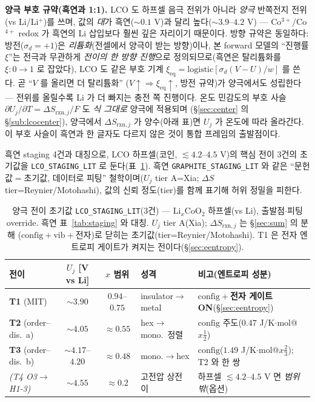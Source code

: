 \documentclass[11pt,a4paper]{article}
\newcommand{\eq}{\mathrm{eq}}
\newcommand{\rxn}{\mathrm{rxn}}
\newcommand{\config}{\mathrm{config}}
\newcommand{\vib}{\mathrm{vib}}
\newcommand{\code}[1]{\texttt{#1}}
\begin{document}
\textbf{양극 부호 규약(흑연과 1:1).} LCO 도 하프셀 음극 전위가 아니라 \emph{양극} 반쪽전지 전위(vs Li/Li$^+$)를 쓰며,
값의 \emph{대}가 흑연($\sim0.1$ V)과 달리 높다($\sim3.9$--$4.2$ V) — Co$^{3+}/$Co$^{4+}$ redox 가 흑연의 Li 삽입보다
훨씬 깊은 자리이기 때문이다. 방향 규약은 동일하다: 방전($\sigma_d=+1$)은 \emph{리튬화}(전셀에서 양극이 받는 방향)이나,
본 forward 모델의 ``진행률 $\xi$''는 전극과 무관하게 \emph{전이의 한 방향 진행}으로 정의되므로(흑연은 탈리튬화를 $\xi:0\to1$
로 잡았다), LCO 도 같은 부호 기계 $\xi_\eq=\mathrm{logistic}[\sigma_d(V-U)/w]$ 를 쓴다. 곧 ``$V$ 를 올리면 더 탈리튬화''
($V\!\uparrow\Rightarrow\xi_\eq\!\uparrow$, 방전 규약)가 양극에서도 성립한다 — 전위를 올릴수록 Li 가 더 빠지는 충전 쪽
진행이다. 온도 민감도의 부호 사슬 $\partial U_j/\partial T=\Delta S_{\rxn,j}/F$ 도 \emph{식 그대로} 양극에 적용되며
(\S\ref{sec:center} 의 \S\ref{sub:lcocenter}), 양극에서 $\Delta S_{\rxn,j}$ 가 양수(아래 표)면 $U_j$ 가 온도에 따라
올라간다. 이 부호 사슬이 흑연과 한 글자도 다르지 않은 것이 통합 프레임의 출발점이다.

흑연 staging 4건과 대칭으로, LCO 하프셀(코인, $\lesssim4.2$--$4.5$ V)의 핵심 전이 3건의 초기값을 \code{LCO\_STAGING\_LIT}
로 둔다(표~\ref{tab:lcostaging}). 흑연 \code{GRAPHITE\_STAGING\_LIT} 와 같은 ``문헌값$=$초기값, 데이터로 피팅''
철학이며($U_j$ tier A=Xia\cite{xia2007}; $\Delta S$ tier=Reynier\cite{reynier2004}/Motohashi\cite{motohashi2009}), 값의 신뢰 정도(tier)를
함께 표기해 허위 정밀을 피한다.

\begin{table}[t]
\centering
\renewcommand{\arraystretch}{1.3}
\caption{양극 전이 초기값 \code{LCO\_STAGING\_LIT}(3건) — $\mathrm{Li}_x\mathrm{CoO_2}$ 하프셀(vs Li), 출발점$\cdot$피팅
override. 흑연 표~\ref{tab:staging} 와 대칭. $U_j$ tier A(Xia); $\Delta S_{\rxn,j}$ 는 \S\ref{sec:sum} 의 분해
($\config+\vib+$전자)로 닫히는 초기값(tier=Reynier/Motohashi). T1 은 전자 엔트로피 게이트가 켜지는 전이다(\S\ref{sec:eentropy}).}
\label{tab:lcostaging}
\begin{tabular}{@{}l c c p{} p{}@{}}
\toprule
전이 & $U_j$ [V vs Li] & $x$ 범위 & 성격 & 비고(엔트로피 성분) \\
\midrule
\textbf{T1} (MIT)            & $\sim3.90$        & $0.94$--$0.75$ & insulator$\to$metal      & $\config+$\textbf{전자 게이트 ON}(\S\ref{sec:eentropy}) \\
\textbf{T2} (order--dis.\ a) & $\sim4.05$        & $\approx0.55$  & hex$\to$mono.\ 정렬       & $\config$ 주도($0.47$ J/K$\cdot$mol@$x\tfrac12$) \\
\textbf{T3} (order--dis.\ b) & $\sim4.17$--$4.20$ & $\approx0.48$  & mono.$\to$hex            & $\config$($1.49$ J/K$\cdot$mol@$x\tfrac23$); T2 와 한 쌍 \\
\midrule
\textit{(T4 O3$\to$H1-3)}    & $\sim4.55$        & $\approx0.2$   & 고전압 상전이             & 하프셀 $\lesssim4.2$--$4.5$ V 면 \emph{범위 밖}(옵션) \\
\bottomrule
\end{tabular}
\end{table}
\end{document}

